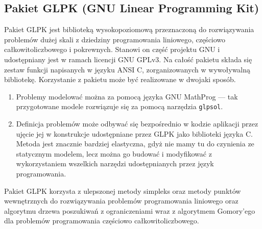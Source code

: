 \subsection{Pakiet GLPK (GNU Linear Programming Kit)} %
\label{ss_internals_glpk}
\par{
  Pakiet GLPK jest biblioteką wysokopoziomową przeznaczoną do rozwiązywania problemów dużej skali z dziedziny programowania liniowego, częściowo całkowitoliczbowego i pokrewnych.
  Stanowi on część projektu GNU i udostępniany jest w ramach licencji GNU GPLv3.
  Na całość pakietu składa się zestaw funkcji napisanych w języku ANSI C, zorganizowanych w wywoływalną bibliotekę.
  Korzystanie z pakietu może być realizowane w dwojaki sposób.
  \begin{enumerate}
    \item Problemy modelować można za pomocą języka GNU MathProg --- tak przygotowane modele rozwiązuje się za pomocą narzędzia \texttt{glpsol}.
    \item Definicja problemów może odbywać się bezpośrednio w kodzie aplikacji przez ujęcie jej w konstrukcje udostępniane przez GLPK jako biblioteki języka C. Metoda jest znacznie bardziej elastyczna, gdyż nie mamy tu do czynienia ze statycznym modelem, lecz można go budować i modyfikować z wykorzystaniem wszelkich narzędzi udostępnianych przez język programowania.
  \end{enumerate}
}
\par{
  Pakiet GLPK korzysta z ulepszonej metody simpleks oraz metody punktów wewnętrznych do rozwiązywania problemów programowania liniowego oraz algorytmu drzewa poszukiwań z ograniczeniami wraz z algorytmem Gomory'ego dla problemów programowania częściowo całkowitoliczbowego.
}
